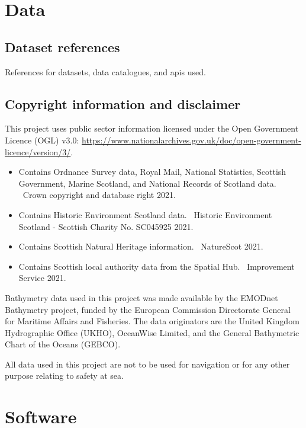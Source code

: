 \chapter{Data \label{app:data}}

\section*{Dataset references}

References for datasets, data catalogues, and \glspl{api} used.

\printbibliography[heading=none,keyword=data]

\section*{Copyright information and disclaimer}

This project uses public sector information licensed under the Open Government Licence (OGL) v3.0:
\url{https://www.nationalarchives.gov.uk/doc/open-government-licence/version/3/}.

\begin{itemize}[noitemsep]
  \item Contains Ordnance Survey data, Royal Mail, National Statistics, Scottish Government, Marine Scotland, and National Records of Scotland data. \textcopyright~Crown copyright and database right 2021.
  \item Contains Historic Environment Scotland data. \textcopyright~Historic Environment Scotland - Scottish Charity No. SC045925 2021.
  \item Contains Scottish Natural Heritage information. \textcopyright~NatureScot 2021.
  \item Contains Scottish local authority data from the Spatial Hub. \textcopyright~Improvement Service 2021.
\end{itemize}

Bathymetry data used in this project was made available by the EMODnet Bathymetry project, funded by the European Commission Directorate General for Maritime Affairs and Fisheries. The data originators are the United Kingdom Hydrographic Office (UKHO), OceanWise Limited, and the General Bathymetric Chart of the Oceans (GEBCO).

All data used in this project are not to be used for navigation or for any other purpose relating to safety at sea.

\chapter{Software \label{app:soft}}


